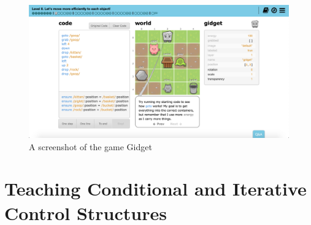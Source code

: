 \documentclass[a4paper,11.5pt]{report}
\numberwithin{figure}{section}
\numberwithin{table}{section}
\numberwithin{equation}{section}
\numberwithin{equation}{section}
\begin{document}
\begin{figure}[H]
 \centering
    \includegraphics[width=1\textwidth]{Gidget-Example}
       \captionsetup{justification=centering}
\caption{A screenshot of the game Gidget {\citep{gidgetsite}}}
\label{fig:Gidget-Example}
\end{figure}














\section{Teaching Conditional and Iterative Control Structures}

\end{document}
